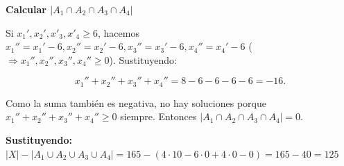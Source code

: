 \documentclass[a4paper,12pt]{article}
\begin{document}
\begin{ejercicio}[title=Ejercicio 36]
\textbf{Calcular \(|A_1 \cap A_2 \cap A_3 \cap A_4|\)}

Si \(x_1', x_2', x'_3, x'_4 \ge 6\), hacemos \(x_1'' = x_1'-6, x_2'' = x_2'-6,  x_3'' = x_3'-6, x_4'' = x_4'-6\) (\(\Rightarrow x_1'', x_2'', x_3'', x_4'' \ge 0\)). Sustituyendo:

\[
x_1'' + x_2'' + x_3'' + x_4'' = 8 - 6 - 6 - 6 - 6 = -16.
\]

\vspace{0.5em}

Como la suma también es negativa, no hay soluciones porque $x_1'' + x_2'' + x_3'' + x_4'' \ge 0$ siempre. Entonces \(|A_1 \cap A_2 \cap A_3 \cap A_4| = 0\).

\vspace{1em}

\textbf{Sustituyendo:} \(|X| - |A_1 \cup A_2 \cup A_3 \cup A_4| = 165 - (4\cdot 10 - 6\cdot 0 + 4\cdot 0 - 0) = 165 - 40 = \boxed{125}\)

\end{ejercicio}
\end{document}
